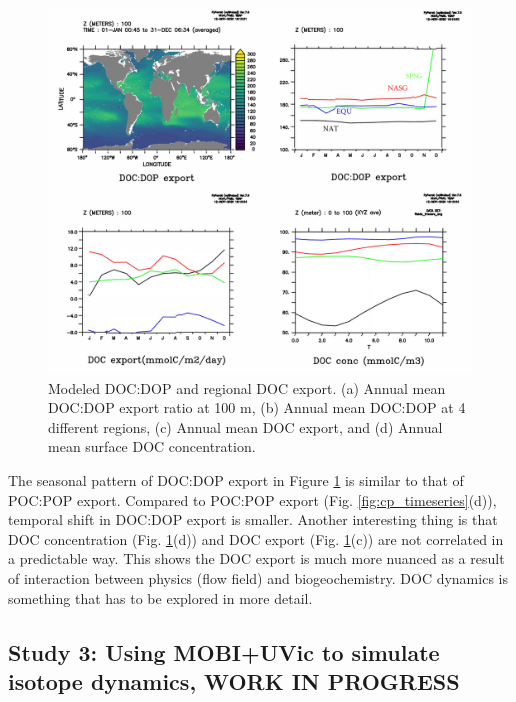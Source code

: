 \documentclass[a4paper]{article}
\begin{document}
\begin{enumerate}
\begin{figure}[h!]   %
   \centering
   \includegraphics[scale=0.6]{doc_regional.pdf}
   \caption[]{Modeled DOC:DOP and regional DOC export. (a) Annual mean DOC:DOP export ratio at 100 m, (b) Annual mean DOC:DOP at 4 different regions, (c) Annual mean DOC export, and (d) Annual mean surface DOC concentration.}
   \label{fig:doc_regional}
\end{figure}

The seasonal pattern of DOC:DOP export in Figure \ref{fig:doc_regional} is similar to that of POC:POP export. Compared to POC:POP export (Fig. \ref{fig:cp_timeseries}(d)), temporal shift in DOC:DOP export is smaller. Another interesting thing is that DOC concentration (Fig. \ref{fig:doc_regional}(d)) and DOC export (Fig. \ref{fig:doc_regional}(c)) are not correlated in a predictable way. This shows the DOC export is much more nuanced as a result of interaction between physics (flow field) and biogeochemistry. DOC dynamics is something that has to be explored in more detail.

\end{enumerate}


\subsection{Study 3: Using MOBI+UVic to simulate isotope dynamics, WORK IN PROGRESS} 
\end{document}
